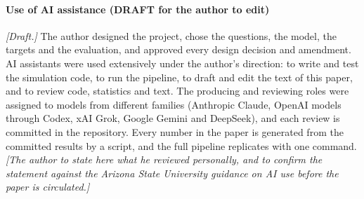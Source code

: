 \paragraph{Use of AI assistance (DRAFT for the author to edit)}
\textit{[Draft.]} The author designed the project, chose the questions, the model,
the targets and the evaluation, and approved every design decision and amendment.
AI assistants were used extensively under the author's direction: to write and test
the simulation code, to run the pipeline, to draft and edit the text of this paper,
and to review code, statistics and text. The producing and reviewing roles were
assigned to models from different families (Anthropic Claude, OpenAI models through
Codex, xAI Grok, Google Gemini and DeepSeek), and each review is committed in the
repository. Every number in the paper is generated from the committed results by a
script, and the full pipeline replicates with one command. \textit{[The author to
state here what he reviewed personally, and to confirm the statement against the
Arizona State University guidance on AI use before the paper is circulated.]}
